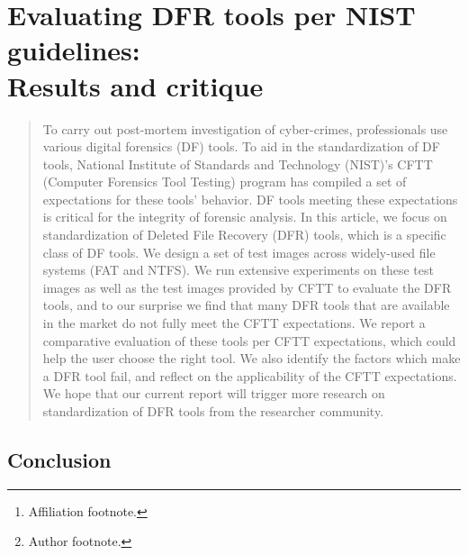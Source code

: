 \documentclass{ws-rv9x6}
\begin{document}
\chapter[Evaluating DFR tools per NIST guidelines]{Evaluating DFR tools per NIST guidelines:\\ Results and critique \label{ra_ch1}}

\author[A. Meyer and S. Roy]{Andrew Meyer and S. Roy\footnote{Author footnote.}}

\address{Computer Science Department, BGSU,\\
Bowling Green, Ohio, USA 43403, \\
apmeyer@bgsu.edu\footnote{Affiliation footnote.}}
 
\begin{abstract}
To carry out post-mortem investigation of cyber-crimes, 
professionals use various digital forensics (DF) tools. 
To aid in the standardization of DF tools, 
National Institute of Standards and Technology (NIST)’s 
CFTT (Computer Forensics Tool Testing) program 
has compiled a set of expectations for these tools’ behavior. 
DF tools meeting these expectations is critical for the 
integrity of forensic analysis. In this article, we focus 
on standardization of Deleted File Recovery (DFR) tools, 
which is a specific class of DF tools. We design a set of 
test images across widely-used file systems (FAT and NTFS). 
We run extensive experiments on these test images as well as 
the test images provided by CFTT to evaluate the DFR tools, 
and to our surprise we find that many DFR tools that are available 
in the market do not fully meet the CFTT expectations. 
We report a comparative evaluation of these tools per CFTT 
expectations, which could help the user choose the right tool. 
We also identify the factors which make a DFR tool fail, and 
reflect on the applicability of the CFTT expectations. 
We hope that our current report will trigger more research 
on standardization of DFR tools from the researcher community.
\end{abstract}


\body








\section{Conclusion}\label{conclusion}
\end{document}
